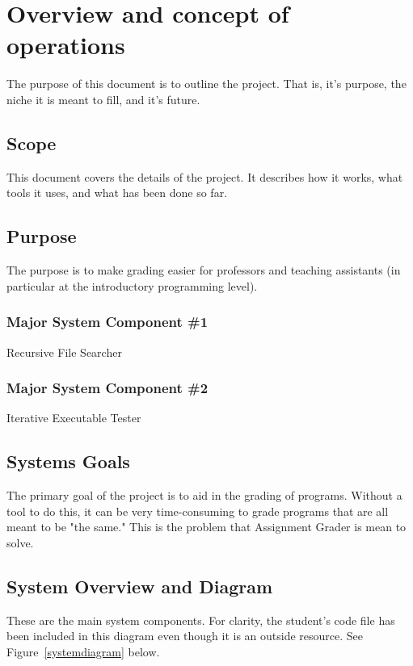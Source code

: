 
\chapter{Overview and concept of operations}

The purpose of this document is to outline the project. That is, it's purpose, the niche it is meant to fill, and it's future.


\section{Scope}
This document covers the details of the project. It describes how it works, what tools it uses, and what has been done so far.


\section{Purpose}
The purpose is to make grading easier for professors and teaching assistants (in particular at the introductory programming level).


\subsection{Major System Component \#1}
Recursive File Searcher

\subsection{Major System Component \#2}
Iterative Executable Tester

\section{Systems Goals}
The primary goal of the project is to aid in the grading of programs. Without a tool to do this, it can be very time-consuming to grade programs that are all meant to be "the same." This is the problem that Assignment Grader is mean to solve.

\section{System Overview and Diagram}
These are the main system components. For clarity, the student's code file has been included in this diagram even though it is an outside resource. See Figure~\ref{systemdiagram} below.

